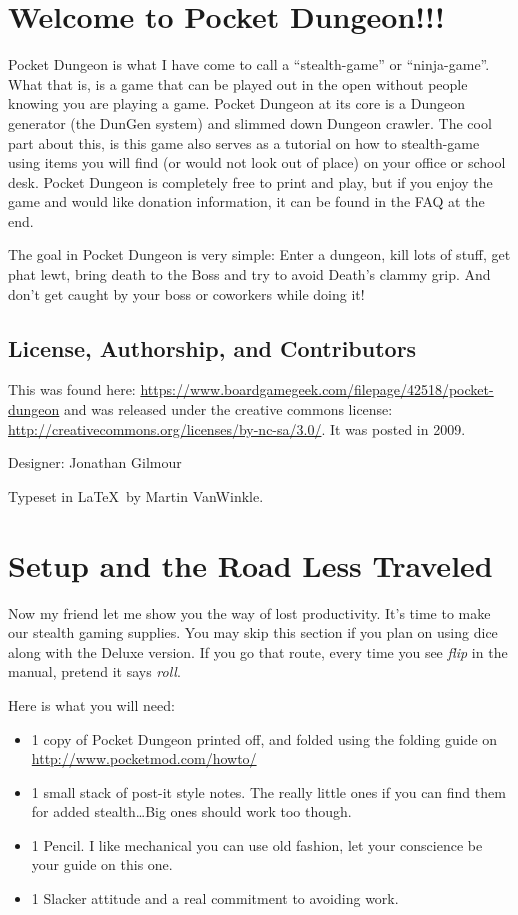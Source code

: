 \documentclass[a6paper,hidelinks]{article}
\begin{document}
\tableofcontents

\section{Welcome to Pocket Dungeon!!!}
Pocket Dungeon is what I have come to call a ``stealth-game'' or ``ninja-game''. What that is, is a game that can be played out in the open without people knowing you are playing a game. Pocket Dungeon at its core is a Dungeon generator (the DunGen system) and slimmed down Dungeon crawler. The cool part about this, is this game also serves as a tutorial on how to stealth-game using items you will find (or would not look out of place) on your office or school desk. Pocket Dungeon is completely free to print and play, but if you enjoy the game and would like donation information, it can be found in the FAQ at the end.

The goal in Pocket Dungeon is very simple:  Enter a dungeon, kill lots of stuff, get phat lewt, bring death to the Boss and try to avoid Death's clammy grip. And don't get caught by your boss or coworkers while doing it!

\subsection{License, Authorship, and Contributors}

This was found here: \url{https://www.boardgamegeek.com/filepage/42518/pocket-dungeon} and was released under the creative commons license: \url{http://creativecommons.org/licenses/by-nc-sa/3.0/}.  It was posted in 2009.

Designer: Jonathan Gilmour

Typeset in \LaTeX\ by Martin VanWinkle.

\section{Setup and the Road Less Traveled}
Now my friend let me show you the way of lost productivity. It’s time to make our stealth gaming supplies. You may skip this section if you plan on using dice  along with the Deluxe version. If you go that route, every time you see {\em flip} in the manual, pretend it says {\em roll}.

Here is what you will need:

\begin{itemize}
  \item 1 copy of Pocket Dungeon printed off, and folded using the folding guide on \url{http://www.pocketmod.com/howto/}
  \item 1 small stack of post-it style notes. The really little ones if you can find them for added stealth\ldots Big ones should work too though.
  \item 1 Pencil. I like mechanical you can use old fashion, let your conscience be your guide on this one.
  \item 1 Slacker attitude and a real commitment to avoiding work.

\end{itemize}
\end{document}

